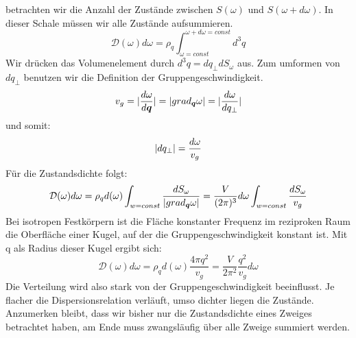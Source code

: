 \documentclass[11pt]{article}
\DeclarePairedDelimiter\abs{\lvert}{\rvert}
\begin{document}
betrachten wir die Anzahl der Zustände zwischen $S(\omega)$ und $S(\omega+d
\omega)$. In dieser Schale müssen wir alle Zustände aufsummieren.
\begin{equation}
  \mathcal{D}(\omega)d\omega=\rho_q
  \int_{\omega=const}^{\omega+d\omega=const}d^3q
\end{equation}
Wir drücken das Volumenelement durch $d^3q=dq_\perp dS_\omega$ aus. Zum
umformen von $dq_\perp$ benutzen wir die Definition der Gruppengeschwindigkeit.
\begin{equation}
  v_g=\abs{\frac{d\omega}{d\bm{q}}}=\abs{grad_{\bm{q}}\omega}=
  \abs{\frac{d\omega}{dq_\perp}}
\end{equation}
und somit:
\begin{equation}
  \abs{dq_\perp}=\frac{d\omega}{v_g}
\end{equation}
Für die Zustandsdichte folgt:
\begin{equation}
  \mathcal{D}(\omega)d\omega=\rho_qd(\omega)\int_{w=const}\frac{dS_\omega}
  {\abs{grad_{\bm{q}}\omega}}=
  \frac{V}{(2\pi)^3}d\omega\int_{w=const}\frac{dS_\omega}{v_g}
\end{equation}
Bei isotropen Festkörpern ist die Fläche konstanter Frequenz im reziproken Raum
die Oberfläche einer Kugel, auf der die Gruppengeschwindigkeit konstant ist. Mit
q als Radius dieser Kugel ergibt sich:
\begin{equation}
  \mathcal{D}(\omega)d\omega=\rho_qd(\omega)\frac{4\pi q^2}{v_g}
  =\frac{V}{2\pi^2}\frac{q^2}{v_g}d\omega
\end{equation}
Die Verteilung wird also stark von der Gruppengeschwindigkeit beeinflusst. Je
flacher die Dispersionsrelation verläuft, umso dichter liegen die Zustände.
Anzumerken bleibt, dass wir bisher nur die Zustandsdichte eines Zweiges
betrachtet haben, am Ende muss zwangsläufig über alle Zweige summiert werden.
\end{document}
